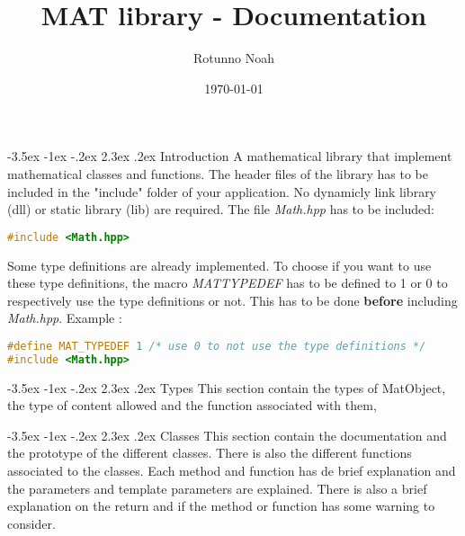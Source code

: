 \documentclass[a4paper, 12pt,oneside]{article}
\makeatletter
\renewcommand{\section}{\@startsection {section}{1}{\z@}%
             {-3.5ex \@plus -1ex \@minus -.2ex}%
             {2.3ex \@plus.2ex}%
             {\normalfont\normalsize\bfseries}}
\makeatother
\begin{document}
\title{MAT library - Documentation}
\date{\normalsize{\today}}
\author{Rotunno Noah}
\maketitle

\tableofcontents
\newpage

\section{Introduction}
A mathematical library that implement mathematical classes and functions. The header files of the library has to be included in the "include" folder of your application. No dynamicly link library (dll) or static library (lib) are required. The file \textit{Math.hpp} has to be included:

\begin{lstlisting}[language=C++]
#include <Math.hpp>
\end{lstlisting}

Some type definitions are already implemented. To choose if you want to use these type definitions, the macro \textit{MAT\textunderscore TYPEDEF}
 has to be defined to 1  or 0 to respectively use the type definitions or not. This has to be done \textbf{before} including \textit{Math.hpp}. Example :

\begin{lstlisting}[language=C++]
#define MAT_TYPEDEF 1 /* use 0 to not use the type definitions */
#include <Math.hpp>
\end{lstlisting}

\section{Types}
This section contain the types of MatObject, the type of content allowed and the function associated with them,


\section{Classes}
This section contain the documentation and the prototype of the different classes. There is also the different functions associated to the classes. Each method and function has de brief explanation and the parameters and template parameters are explained. There is also a brief explanation on the return and if the method or function has some warning to consider.


\end{document}
